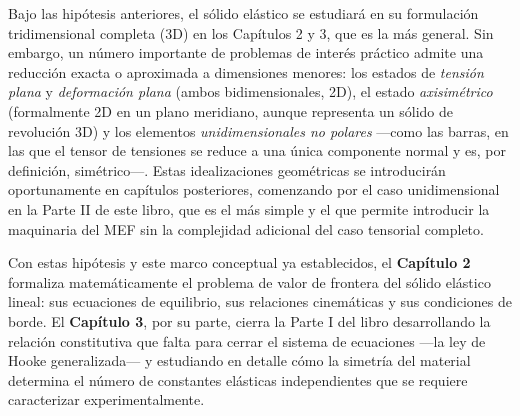 \begin{observacion}
Bajo las hipótesis anteriores, el sólido elástico se estudiará en su formulación tridimensional completa (3D) en los Capítulos 2 y 3, que es la más general. Sin embargo, un número importante de problemas de interés práctico admite una reducción exacta o aproximada a dimensiones menores: los estados de \emph{tensión plana} y \emph{deformación plana} (ambos bidimensionales, 2D), el estado \emph{axisimétrico} (formalmente 2D en un plano meridiano, aunque representa un sólido de revolución 3D) y los elementos \emph{unidimensionales no polares} —como las barras, en las que el tensor de tensiones se reduce a una única componente normal y es, por definición, simétrico—. Estas idealizaciones geométricas se introducirán oportunamente en capítulos posteriores, comenzando por el caso unidimensional en la Parte II de este libro, que es el más simple y el que permite introducir la maquinaria del MEF sin la complejidad adicional del caso tensorial completo.
\end{observacion}

Con estas hipótesis y este marco conceptual ya establecidos, el \textbf{Capítulo 2} formaliza matemáticamente el problema de valor de frontera del sólido elástico lineal: sus ecuaciones de equilibrio, sus relaciones cinemáticas y sus condiciones de borde. El \textbf{Capítulo 3}, por su parte, cierra la Parte I del libro desarrollando la relación constitutiva que falta para cerrar el sistema de ecuaciones —la ley de Hooke generalizada— y estudiando en detalle cómo la simetría del material determina el número de constantes elásticas independientes que se requiere caracterizar experimentalmente.
